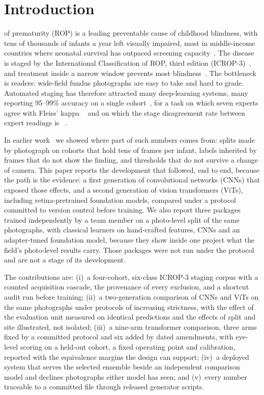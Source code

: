\documentclass[journal]{IEEEtran}
\begin{document}
\section{Introduction}
 of prematurity (ROP) is a leading preventable cause of childhood blindness, with tens of thousands of infants a year left visually impaired, most in middle-income countries where neonatal survival has outpaced screening capacity~\cite{blencowe2013}. The disease is staged by the International Classification of ROP, third edition (ICROP-3)~\cite{icrop3}, and treatment inside a narrow window prevents most blindness~\cite{etrop2003}. The bottleneck is readers: wide-field fundus photographs are easy to take and hard to grade. Automated staging has therefore attracted many deep-learning systems, many reporting 95--99\% accuracy on a single cohort~\cite{vahid2026}, for a task on which seven experts agree with Fleiss' kappa \humanInterKappa{}~\cite{gschliesser2015} and on which the stage disagreement rate between expert readings is \humanDisagree{}~\cite{campbell2016}.

In earlier work~\cite{nagpure2026} we showed where part of such numbers comes from: splits made by photograph on cohorts that hold tens of frames per infant, labels inherited by frames that do not show the finding, and thresholds that do not survive a change of camera. This paper reports the development that followed, end to end, because the path is the evidence: a first generation of convolutional networks (CNNs) that exposed those effects, and a second generation of vision transformers (ViTs), including retina-pretrained foundation models, compared under a protocol committed to version control before training. We also report three packages trained independently by a team member on a photo-level split of the same photographs, with classical learners on hand-crafted features, CNNs and an adapter-tuned foundation model, because they show inside one project what the field's photo-level results carry. Those packages were not run under the protocol and are not a stage of its development.

The contributions are: (i)~a four-cohort, six-class ICROP-3 staging corpus with a counted acquisition cascade, the provenance of every exclusion, and a shortcut audit run before training; (ii)~a two-generation comparison of CNNs and ViTs on the same photographs under protocols of increasing strictness, with the effect of the evaluation unit measured on identical predictions and the effects of split and site illustrated, not isolated; (iii)~a nine-arm transformer comparison, three arms fixed by a committed protocol and six added by dated amendments, with eye-level scoring on a held-out cohort, a fixed operating point and calibration, reported with the equivalence margins the design can support; (iv)~a deployed system that serves the selected ensemble beside an independent comparison model and declines photographs either model has seen; and (v)~every number traceable to a committed file through released generator scripts.
\end{document}
